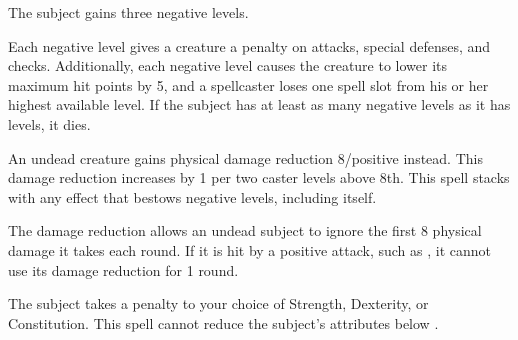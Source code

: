 \spelldur{\durshort}
\spelleffect The subject gains three negative levels.
\par Each negative level gives a creature a  penalty on attacks, special defenses, and checks. Additionally, each negative level causes the creature to lower its maximum hit points by 5, and a spellcaster loses one spell slot from his or her highest available level. If the subject has at least as many negative levels as it has levels, it dies.
\par An undead creature gains physical damage reduction 8/positive instead. This damage reduction increases by 1 per two caster levels above 8th.
\spellnotes This spell stacks with any effect that bestows negative levels, including itself.

The damage reduction allows an undead subject to ignore the first 8 physical damage it takes each round. If it is hit by a positive attack, such as , it cannot use its damage reduction for 1 round.

\spelldur{\durshort}
\spelleffect The subject takes a  penalty to your choice of Strength, Dexterity, or Constitution.
\spellnotes This spell cannot reduce the subject's attributes below .

